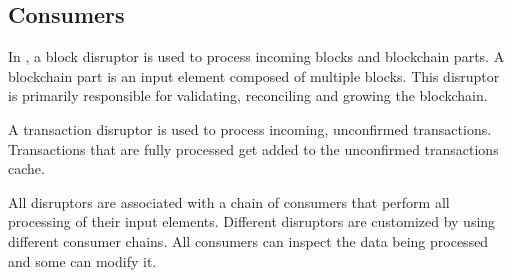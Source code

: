\subsection{Consumers}
\label{sec:disruptor:consumers}
In \codename, a block disruptor is used to process incoming blocks and blockchain parts.
A blockchain part is an input element composed of multiple blocks.
This disruptor is primarily responsible for validating, reconciling and growing the blockchain.

A transaction disruptor is used to process incoming, unconfirmed transactions.
Transactions that are fully processed get added to the unconfirmed transactions cache.

All disruptors are associated with a chain of consumers that perform all processing of their input elements.
Different disruptors are customized by using different consumer chains.
All consumers can inspect the data being processed and some can modify it.

